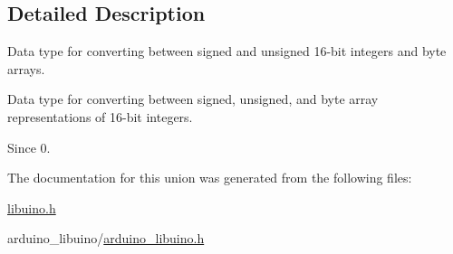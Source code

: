 \subsection{\-Detailed \-Description}
\-Data type for converting between signed and unsigned 16-\/bit integers and byte arrays. 

\-Data type for converting between signed, unsigned, and byte array representations of 16-\/bit integers.

\begin{DoxySince}{\-Since}
0. 
\end{DoxySince}


\-The documentation for this union was generated from the following files\-:\begin{DoxyCompactItemize}
\item 
\hyperlink{libuino_8h}{libuino.\-h}\item 
arduino\-\_\-libuino/\hyperlink{arduino__libuino_8h}{arduino\-\_\-libuino.\-h}\end{DoxyCompactItemize}
